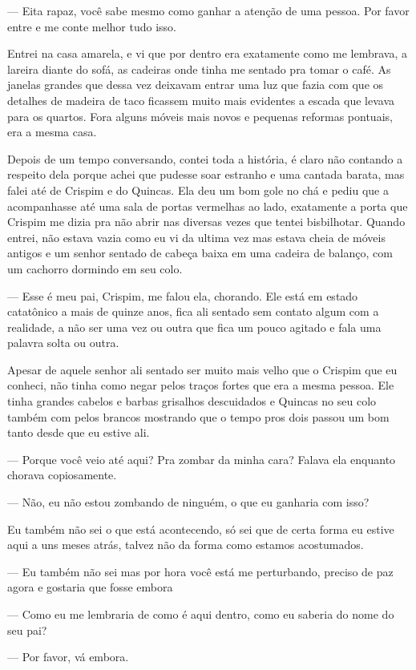 — Eita rapaz, você sabe mesmo como ganhar a atenção de uma pessoa. Por favor entre e me conte melhor tudo isso.

Entrei na casa amarela, e vi que por dentro era exatamente como me lembrava, a lareira diante do sofá, as cadeiras onde tinha me sentado pra tomar o café. As janelas grandes que dessa vez deixavam entrar uma luz que fazia com que os detalhes de madeira de taco ficassem muito mais evidentes a escada que levava para os quartos. Fora alguns móveis mais novos e pequenas reformas pontuais, era a mesma casa.

Depois de um tempo conversando, contei toda a história, é claro não contando a respeito dela porque achei que pudesse soar estranho e uma cantada barata, mas falei até de Crispim e do Quincas. Ela deu um bom gole no chá e pediu que a acompanhasse até uma sala de portas vermelhas ao lado, exatamente a porta que Crispim me dizia pra não abrir nas diversas vezes que tentei bisbilhotar. Quando entrei, não estava vazia como eu vi da ultima vez mas estava cheia de móveis antigos e um senhor sentado de cabeça baixa em uma cadeira de balanço, com um cachorro dormindo em seu colo.

— Esse é meu pai, Crispim, me falou ela, chorando. Ele está em estado catatônico a mais de quinze anos, fica ali sentado sem contato algum com a realidade, a não ser uma vez ou outra que fica um pouco agitado e fala uma palavra solta ou outra.

Apesar de aquele senhor ali sentado ser muito mais velho que o Crispim que eu conheci, não tinha como negar pelos traços fortes que era a mesma pessoa. Ele tinha grandes cabelos e barbas grisalhos descuidados e Quincas no seu colo também com pelos brancos mostrando que o tempo pros dois passou um bom tanto desde que eu estive ali.

— Porque você veio até aqui? Pra zombar da minha cara? Falava ela enquanto chorava copiosamente.

— Não, eu não estou zombando de ninguém, o que eu ganharia com isso? 

Eu também não sei o que está acontecendo, só sei que de certa forma eu estive aqui a uns meses atrás, talvez não da forma como estamos acostumados.

— Eu também não sei mas por hora você está me perturbando, preciso de paz agora e gostaria que fosse embora

— Como eu me lembraria de como é aqui dentro, como eu saberia do nome do seu pai?

— Por favor, vá embora.

